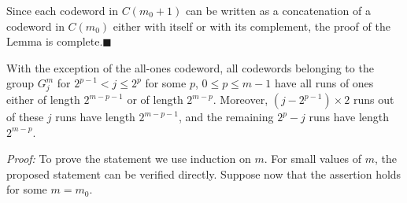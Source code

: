Since each
codeword in $C(m_0+1)$ can be written as a concatenation of a
codeword in $C(m_0)$ either with itself or with its complement,
the proof of the Lemma is complete.\hfill $\blacksquare$

\small


\normalsize
\begin{lemma}\label{LE4}
With the exception of the all-ones codeword, all codewords
belonging to the group $G_j^m$ for $2^{p-1}<j \leq 2^{p}$ for some
$p$, $0 \leq p \leq m-1$ have all runs of ones either of length
$2^{m-p-1}$ or of length $2^{m-p}$. Moreover, $(j-2^{p-1})\times
2$ runs out of these $j$ runs have length $2^{m-p-1}$, and the
remaining $2^{p}-j$ runs have length $2^{m-p}$.
\end{lemma}
\noindent \textit{Proof:} To prove the statement we use induction
on $m$. For small values of $m$, the proposed statement can be
verified directly. Suppose now that the assertion holds for some
$m=m_0$.

